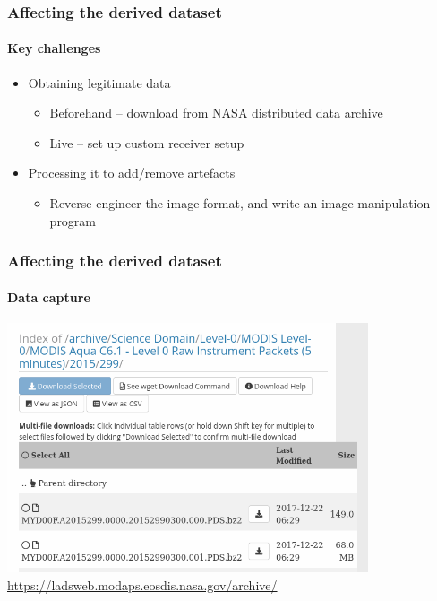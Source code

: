\documentclass{beamer}
\begin{document}
\begin{frame}
  \frametitle{Affecting the derived dataset}
  \framesubtitle{Key challenges}
  \begin{itemize}
    \item Obtaining legitimate data
    \begin{itemize}
      \item Beforehand -- download from NASA distributed data archive
      \item Live -- set up custom receiver setup
    \end{itemize}

    \item Processing it to add/remove artefacts
    \begin{itemize}
      \item Reverse engineer the image format, and write an image manipulation program
    \end{itemize}
  \end{itemize}
\end{frame}

\begin{frame}
  \frametitle{Affecting the derived dataset}
  \framesubtitle{Data capture}
  \centering
  \includegraphics[width=0.8\textwidth]{images/level0.png}
  \url{https://ladsweb.modaps.eosdis.nasa.gov/archive/}
\end{frame}
\end{document}

